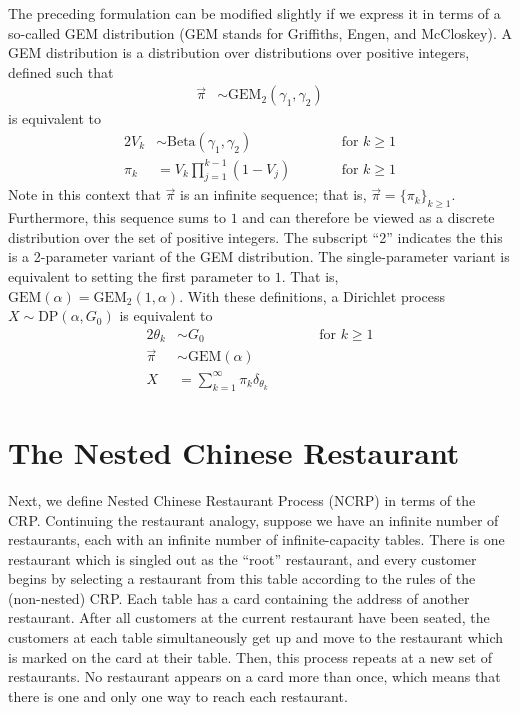 \documentclass{article}
\begin{document}
The preceding formulation can be modified slightly if we express it in terms of a so-called GEM distribution (GEM stands for Griffiths, Engen, and McCloskey).
A GEM distribution is a distribution over distributions over positive integers, defined such that
\begin{align}
\vec \pi &\sim \text{GEM}_2(\gamma_1, \gamma_2)
\end{align}
is equivalent to
\begin{alignat}{2}
V_k &\sim \text{Beta}(\gamma_1, \gamma_2) &\qquad& \text{for $k \geq 1$} \\
\pi_k &= V_k \prod_{j=1}^{k-1} (1 - V_j) &\qquad& \text{for $k \geq 1$}
\end{alignat}
Note in this context that $\vec \pi$ is an infinite sequence; that is, $\vec \pi = \{ \pi_k \}_{k \geq 1}$.
Furthermore, this sequence sums to $1$ and can therefore be viewed as a discrete distribution over the set of positive integers.
The subscript ``2'' indicates the this is a 2-parameter variant of the GEM distribution.
The single-parameter variant is equivalent to setting the first parameter to $1$.
That is, $\text{GEM}(\alpha) = \text{GEM}_2(1, \alpha)$.
With these definitions, a Dirichlet process $X \sim \text{DP}(\alpha, G_0)$ is equivalent to
\begin{alignat}{2}
\theta_k &\sim G_0 &\qquad& \text{for $k \geq 1$} \\
\vec \pi &\sim \text{GEM}(\alpha) && \\
X &= \sum_{k=1}^\infty \pi_k \delta_{\theta_k} &&
\end{alignat}

\section{The Nested Chinese Restaurant}

Next, we define Nested Chinese Restaurant Process (NCRP) in terms of the CRP.
Continuing the restaurant analogy, suppose we have an infinite number of restaurants, each with an infinite number of infinite-capacity tables.
There is one restaurant which is singled out as the ``root'' restaurant, and every customer begins by selecting a restaurant from this table according to the rules of the (non-nested) CRP.
Each table has a card containing the address of another restaurant.
After all customers at the current restaurant have been seated, the customers at each table simultaneously get up and move to the restaurant which is marked on the card at their table.
Then, this process repeats at a new set of restaurants.
No restaurant appears on a card more than once, which means that there is one and only one way to reach each restaurant.
\end{document}
